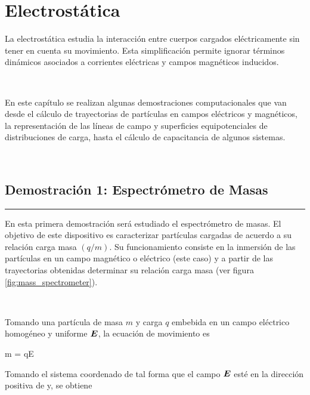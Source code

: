 \chapter{Electrostática}
\label{cha:electrostatic}

La electrostática estudia la interacción entre cuerpos cargados 
eléctricamente sin tener en cuenta su movimiento. Esta simplificación 
permite ignorar términos dinámicos asociados a corrientes eléctricas y 
campos magnéticos inducidos.

\

En este capítulo se realizan algunas demostraciones computacionales que 
van desde el cálculo de trayectorias de partículas en campos eléctricos y 
magnéticos, la representación de las líneas de campo y superficies 
equipotenciales de distribuciones de carga, hasta el cálculo de 
capacitancia de algunos sistemas.



\
\section{Demostración 1: Espectrómetro de Masas}
\label{sec:DEMO2_01}
\rule{14cm}{0.5mm}

En esta primera demostración será estudiado el espectrómetro de masas. El 
objetivo de este dispositivo es caracterizar partículas cargadas de acuerdo
a su relación carga masa $(q/m)$. Su funcionamiento consiste en la inmersión 
de las partículas en un campo magnético o eléctrico (este caso) y a partir de
las trayectorias obtenidas determinar su relación carga masa (ver figura 
\ref{fig:mass_spectrometer}).

\

Tomando una partícula de masa $m$ y carga $q$ embebida en un campo eléctrico
homogéneo y uniforme $\boldsymbol{ E }$, la ecuación de movimiento es


{m = q\bds E}


Tomando el sistema coordenado de tal forma que el campo $\boldsymbol{ E }$ esté en la
dirección positiva de y, se obtiene


